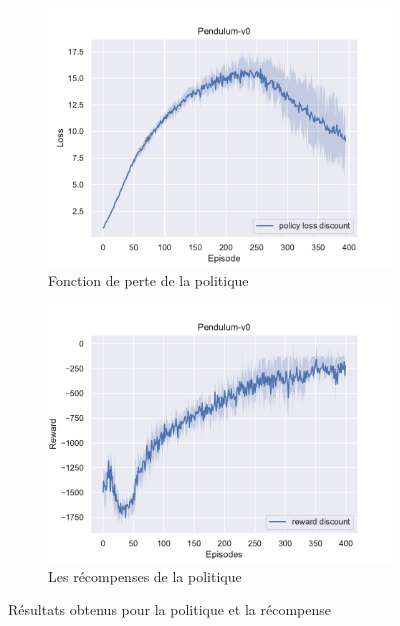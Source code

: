 \begin{figure}[H]
    \centering
    \begin{subfigure}{0.45\textwidth}
        \includegraphics[width=\textwidth]{figures/sac_itr3/policy_loss_Pendulum-v0_pg_dataset_td_trajs_400_update_threshold_1000_nb_updates_20_gamma_0.98_tau_0.01_nstep_5_lr_act_0.0005_lr_critic_0.001_init_alpha_0.02_lr_alpha_0.0_target_entropy_alpha_-1.0pg.pdf}
        \caption{Fonction de perte de la politique}
    \end{subfigure}
    \begin{subfigure}{0.45\textwidth}
        \includegraphics[width=\textwidth]{figures/sac_itr3/rewards_Pendulum-v0_pg_dataset_td_trajs_400_update_threshold_1000_nb_updates_20_gamma_0.98_tau_0.01_nstep_5_lr_act_0.0005_lr_critic_0.001_init_alpha_0.02_lr_alpha_0.0_target_entropy_alpha_-1.0.pdf}
        \caption{Les récompenses de la politique}
    \end{subfigure}
    \caption{Résultats obtenus pour la politique et la récompense}\label{fig:sac:results3}
\end{figure}

